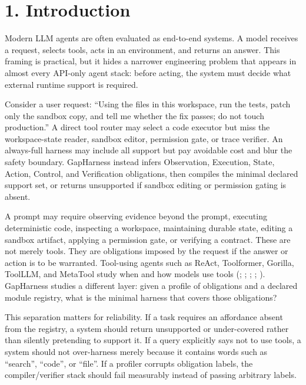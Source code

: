 \documentclass[
  10pt,
]{article}
\begin{document}
\section{1. Introduction}\label{introduction}

Modern LLM agents are often evaluated as end-to-end systems. A model
receives a request, selects tools, acts in an environment, and returns
an answer. This framing is practical, but it hides a narrower
engineering problem that appears in almost every API-only agent stack:
before acting, the system must decide what external runtime support is
required.

Consider a user request: ``Using the files in this workspace, run the
tests, patch only the sandbox copy, and tell me whether the fix passes;
do not touch production.'' A direct tool router may select a code
executor but miss the workspace-state reader, sandbox editor, permission
gate, or trace verifier. An always-full harness may include all support
but pay avoidable cost and blur the safety boundary. GapHarness instead
infers Observation, Execution, State, Action, Control, and Verification
obligations, then compiles the minimal declared support set, or returns
unsupported if sandbox editing or permission gating is absent.

A prompt may require observing evidence beyond the prompt, executing
deterministic code, inspecting a workspace, maintaining durable state,
editing a sandbox artifact, applying a permission gate, or verifying a
contract. These are not merely tools. They are obligations imposed by
the request if the answer or action is to be warranted. Tool-using
agents such as ReAct, Toolformer, Gorilla, ToolLLM, and MetaTool study
when and how models use tools (; ;
;
;
). GapHarness studies
a different layer: given a profile of obligations and a declared module
registry, what is the minimal harness that covers those obligations?

This separation matters for reliability. If a task requires an
affordance absent from the registry, a system should return unsupported
or under-covered rather than silently pretending to support it. If a
query explicitly says not to use tools, a system should not over-harness
merely because it contains words such as ``search'', ``code'', or
``file''. If a profiler corrupts obligation labels, the
compiler/verifier stack should fail measurably instead of passing
arbitrary labels.
\end{document}
